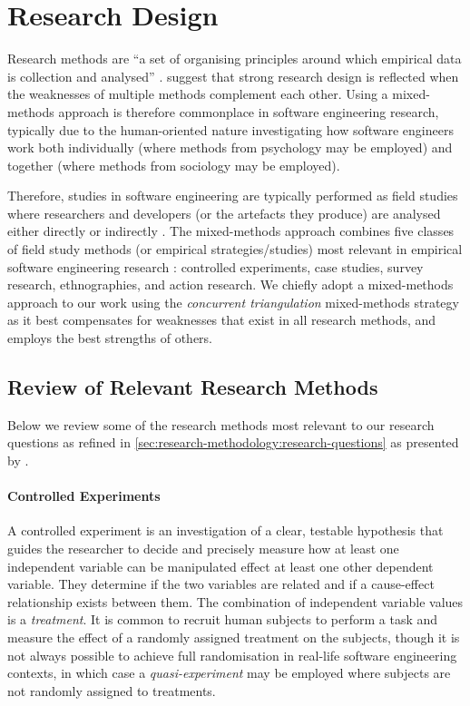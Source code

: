 \section{Research Design}
\label{sec:research-methodology:review}

Research methods are ``a set of organising principles around which empirical data is collection and analysed'' \citep{Easterbrook:2007ws}. \citet{Creswell:2017vn} suggest that strong research design is reflected when the weaknesses of multiple methods complement each other. Using a mixed-methods approach is therefore commonplace in software engineering research, typically due to the human-oriented nature investigating how software engineers work both individually (where methods from psychology may be employed) and together (where methods from sociology may be employed). 

Therefore, studies in software engineering are typically performed as field studies where researchers and developers (or the artefacts they produce) are analysed either directly or indirectly \citep{Singer:2007tu}. The mixed-methods approach combines five classes of field study methods (or empirical strategies/studies) most relevant in empirical software engineering research \citep{Easterbrook:2007ws, Wohlin:2012bu, Juristo:2013vj}: controlled experiments, case studies, survey research, ethnographies, and action research. We chiefly adopt a mixed-methods approach to our work using the \textit{concurrent triangulation} mixed-methods strategy \citep{Jick:1979el} as it best compensates for weaknesses that exist in all research methods, and employs the best strengths of others.



\subsection{Review of Relevant Research Methods}
\label{ssec:research-methodology:review:methods}

Below we review some of the research methods most relevant to our research questions as refined in \cref{sec:research-methodology:research-questions} as presented by \citet{Easterbrook:2007ws}.

\paragraph{Controlled Experiments}
A controlled experiment is an investigation of a clear, testable hypothesis that guides the researcher to decide and precisely measure how at least one independent variable can be manipulated effect at least one other dependent variable. They determine if the two variables are related and if a cause-effect relationship exists between them. The combination of independent variable values is a \textit{treatment}. It is common to recruit human subjects to perform a task and measure the effect of a randomly assigned treatment on the subjects, though it is not always possible to achieve full randomisation in real-life software engineering contexts, in which case a \textit{quasi-experiment} may be employed where subjects are not randomly assigned to treatments.

